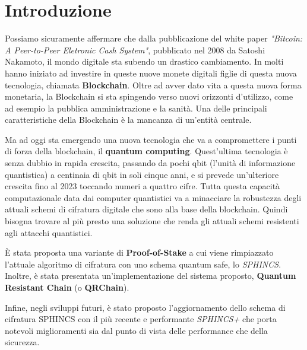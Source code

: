 \chapter*{Introduzione}

Possiamo sicuramente affermare che dalla pubblicazione del white paper \textit{"Bitcoin: A Peer-to-Peer Eletronic Cash System"}, pubblicato nel 2008 da Satoshi Nakamoto, il mondo digitale sta subendo un drastico cambiamento. In molti hanno iniziato ad investire in queste nuove monete digitali figlie di questa nuova tecnologia, chiamata \textbf{Blockchain}. Oltre ad avver dato vita a questa nuova forma monetaria, la Blockchain si sta spingendo verso nuovi orizzonti d'utilizzo, come ad esempio la pubblica amministrazione e la sanità. Una delle principali caratteristiche della Blockchain è la mancanza di un'entità centrale.

Ma ad oggi sta emergendo una nuova tecnologia che va a compromettere i punti di forza della blockchain, il \textbf{quantum computing}. Quest'ultima tecnologia è senza dubbio in rapida crescita, passando da pochi qbit (l'unità di informazione quantistica) a centinaia di qbit in soli cinque anni, e si prevede un'ulteriore crescita fino al 2023 toccando numeri a quattro cifre. Tutta questa capacità computazionale data dai computer quantistici va a minacciare la robustezza degli attuali schemi di cifratura digitale che sono alla base della blockchain. Quindi bisogna trovare al più presto una soluzione che renda gli attuali schemi resistenti agli attacchi quantistici.

È stata proposta una variante di \textbf{Proof-of-Stake} a cui viene rimpiazzato l'attuale algoritmo di cifratura con uno schema quantum safe, lo \textit{SPHINCS}. Inoltre, è stata presentata un'implementazione del sistema proposto, \textbf{Quantum Resistant Chain} (o \textbf{QRChain}).

Infine, negli sviluppi futuri, è stato proposto l'aggiornamento dello schema di cifratura SPHINCS con il più recente e performante \textit{SPHINCS+} che porta notevoli miglioramenti sia dal punto di vista delle performance che della sicurezza.

